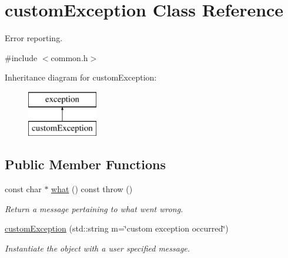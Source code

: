 \hypertarget{classcustom_exception}{\section{custom\-Exception Class Reference}
\label{classcustom_exception}
}


Error reporting.  




{\ttfamily \#include $<$common.\-h$>$}

Inheritance diagram for custom\-Exception\-:\begin{figure}[H]
\begin{center}
\leavevmode
\includegraphics[height=2.000000cm]{classcustom_exception}
\end{center}
\end{figure}
\subsection*{Public Member Functions}
\begin{DoxyCompactItemize}
\item 
\hypertarget{classcustom_exception_aeb6ab5848b038adfc68fde86a512f691}{const char $\ast$ \hyperlink{classcustom_exception_aeb6ab5848b038adfc68fde86a512f691}{what} () const   throw ()}\label{classcustom_exception_aeb6ab5848b038adfc68fde86a512f691}

\begin{DoxyCompactList}\small\item\em Return a message pertaining to what went wrong. \end{DoxyCompactList}\item 
\hypertarget{classcustom_exception_a02ff9f09c4dd8c0b62fb1b6438d7d71a}{\hyperlink{classcustom_exception_a02ff9f09c4dd8c0b62fb1b6438d7d71a}{custom\-Exception} (std\-::string m=\char`\"{}custom exception occurred\char`\"{})}\label{classcustom_exception_a02ff9f09c4dd8c0b62fb1b6438d7d71a}

\begin{DoxyCompactList}\small\item\em Instantiate the object with a user specified message. \end{DoxyCompactList}\end{DoxyCompactItemize}


